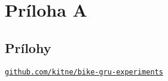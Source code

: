 \section*{Príloha A}
\subsection*{Prílohy}

\texttt{\href{https://github.com/kitne/bike-gru-experiments}{github.com/kitne/bike-gru-experiments}}